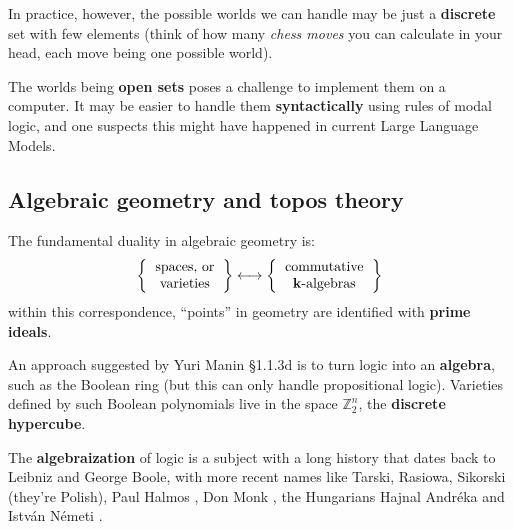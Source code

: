 \documentclass[runningheads]{llncs}
\begin{document}
In practice, however, the possible worlds we can handle may be just a \textbf{discrete} set with few elements (think of how many \textit{chess moves} you can calculate in your head, each move being one possible world).  %

The worlds being \textbf{open sets} poses a challenge to implement them on a computer.  It may be easier to handle them \textbf{syntactically} using rules of modal logic, and one suspects this might have happened in current Large Language Models.

\subsection{Algebraic geometry and topos theory}

The fundamental duality in algebraic geometry is:
\begin{equation}
\left\{ \begin{tabular}{cc} spaces, or \\ varieties \end{tabular} \right\} \longleftrightarrow \left\{ \begin{tabular}{cc} commutative \\ $\mathbf{k}$-algebras \end{tabular} \right\}
\end{equation}
within this correspondence, ``points'' in geometry are identified with \textbf{prime ideals}.

An approach suggested by Yuri Manin \cite{Manin2009} \cite{Manin2018} \S1.1.3d is to turn logic into an \textbf{algebra}, such as the Boolean ring (but this can only handle propositional logic).  Varieties defined by such Boolean polynomials \cite{Lundqvist2015} live in the space $\mathbb{Z}_2^n$, the \textbf{discrete hypercube}.  

The \textbf{algebraization} of logic is a subject with a long history that dates back to Leibniz and George Boole, with more recent names like Tarski, Rasiowa, Sikorski (they're Polish), Paul Halmos \cite{Halmos1962} \cite{Halmos1998}, Don Monk \cite{Monk1971}, the Hungarians Hajnal Andr\'{e}ka and Istv\'{a}n N\'{e}meti \cite{Andreka1991} \cite{Andreka2021}.  
\end{document}
